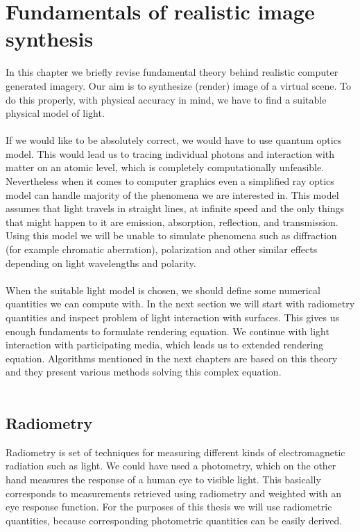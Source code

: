 \chapter{Fundamentals of realistic image synthesis}
\label{ch:2}
In this chapter we briefly revise fundamental theory behind realistic computer generated imagery. Our aim is to synthesize (render) image of a virtual scene. To do this properly, with physical accuracy in mind, we have to find a suitable physical model of light.
\\
\\
If we would like to be absolutely correct, we would have to use quantum optics model. This would lead us to tracing individual photons and interaction with matter on an atomic level, which is completely computationally unfeasible. Nevertheless when it comes to computer graphics even a simplified ray optics model can handle majority of the phenomena we are interested in. This model assumes that light travels in straight lines, at infinite speed and the only things that might happen to it are emission, absorption, reflection, and transmission. Using this model we will be unable to simulate phenomena such as diffraction (for example chromatic aberration), polarization and other similar effects depending on light wavelengths and polarity.
\\
\\
When the suitable light model is chosen, we should define some numerical quantities we can compute with. In the next section we will start with radiometry quantities and inspect problem of light interaction with surfaces. This gives us enough fundaments to formulate rendering equation. We continue with light interaction with participating media, which leads us to extended rendering equation. Algorithms mentioned in the next chapters are based on this theory and they present various methods solving this complex equation.
\\
\\
\clearpage{}
\section{Radiometry}

Radiometry is set of techniques for measuring different kinds of electromagnetic radiation such as light. We could have used a photometry, which on the other hand measures the response of a human eye to visible light. This basically corresponds to measurements retrieved using radiometry and weighted with an eye response function. For the purposes of this thesis we will use radiometric quantities, because corresponding photometric quantities can be easily derived.

